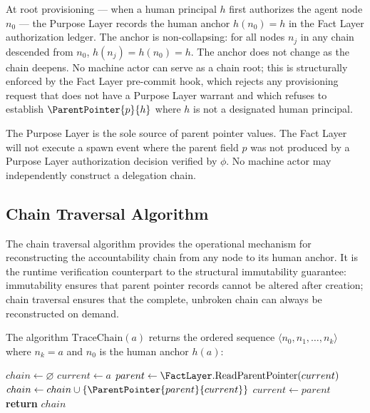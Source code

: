 At root provisioning --- when a human principal $h$ first authorizes the agent node $n_0$ --- the Purpose Layer records the human anchor $h(n_0) = h$ in the Fact Layer authorization ledger. The anchor is non-collapsing: for all nodes $n_j$ in any chain descended from $n_0$, $h(n_j) = h(n_0) = h$. The anchor does not change as the chain deepens. No machine actor can serve as a chain root; this is structurally enforced by the Fact Layer pre-commit hook, which rejects any provisioning request that does not have a Purpose Layer warrant and which refuses to establish $\ParentPointer{p}{h}$ where $h$ is not a designated human principal.

\begin{prop}
\label{prop:rs-exclusive-auth-origin}
The Purpose Layer is the sole source of parent pointer values. The Fact Layer will not execute a spawn event where the parent field $p$ was not produced by a Purpose Layer authorization decision verified by $\phi$. No machine actor may independently construct a delegation chain.
\end{prop}

\subsection{Chain Traversal Algorithm}
\label{sec:rs-chain-traversal-algorithm}

The chain traversal algorithm provides the operational mechanism for reconstructing the accountability chain from any node to its human anchor. It is the runtime verification counterpart to the structural immutability guarantee: immutability ensures that parent pointer records cannot be altered after creation; chain traversal ensures that the complete, unbroken chain can always be reconstructed on demand.

\begin{dfn}
\label{dfn:rs-chain-traversal}
The algorithm $\mathrm{TraceChain}(a)$ returns the ordered sequence $\langle n_0, n_1, \ldots, n_k \rangle$ where $n_k = a$ and $n_0$ is the human anchor $h(a)$:

\begin{algorithmic}
\STATE $chain \leftarrow \varnothing$
\STATE $current \leftarrow a$
    \STATE $parent \leftarrow \FactLayer.\text{ReadParentPointer}(current)$
    \STATE $chain \leftarrow chain \cup \{\ParentPointer{parent}{current}\}$
    \STATE $current \leftarrow parent$
\ENDWHILE
\STATE \textbf{return} $chain$
\end{algorithmic}
\end{dfn}

